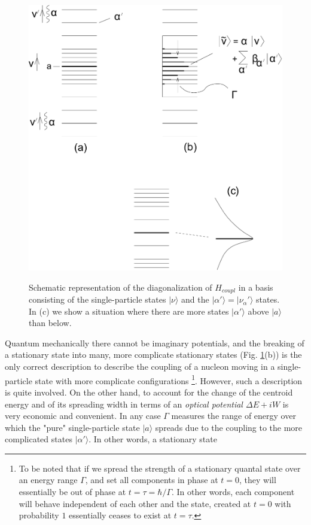 \documentclass[a4paper,14pt]{book}
\begin{document}
\begin{figure}[h!]
\centerline {
{\includegraphics*[width=\textwidth]{figs_C4S/fig_4_5}}
}
\caption{Schematic representation of the diagonalization of $H_{coupl}$ in a basis consisting of the single-particle states $|\nu \rangle$ and the $|\alpha' \rangle=|\nu_{\alpha}' \rangle$ states. In (c) we show a situation where there are more states $|\alpha' \rangle$ above $|a\rangle$ than below.}
\label{fig:4.5}
\end{figure}


Quantum mechanically there cannot be imaginary potentials, and the breaking of a stationary state into many, more complicate stationary states (Fig. \ref{fig:4.5}(b)) is the only correct description to describe the coupling of a nucleon moving in a single-particle state with more complicate configurations \footnote{To be noted that if we spread the strength of a stationary quantal state over an energy range $\Gamma$, and set all components in phase at $t=0$, they will essentially be out of phase at $t=\tau = \hbar/\Gamma$. In other words, each component will behave independent of each other and the state, created at $t=0$ with probability $1$ essentially ceases to exist at $t=\tau$.}. However, such a description is quite involved. On the other hand, to account for the change of the centroid energy and of its spreading width in terms of an {\it optical potential $\Delta E + iW$} is very economic and convenient. In any case $\Gamma$ measures the range of energy over which the "pure" single-particle state $|a\rangle$ spreads due to the coupling to the more complicated states $|\alpha'\rangle$. In other words, a stationary state
\end{document}
